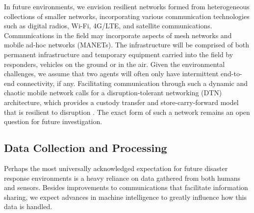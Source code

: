 \documentclass[]             %
{NASA}                       %
\theoremstyle{definition}
\begin{document}
In future environments, we envision resilient networks formed from
heterogeneous collections of smaller networks, incorporating various
communication technologies such as digital radios, Wi-Fi, 4G/LTE, and
satellite communications. Communications in the field may incorporate
aspects of mesh networks and mobile ad-hoc networks (MANETs). The
infrastructure will be comprised of both permanent infrastructure and
temporary equipment carried into the field by responders, vehicles on
the ground or in the air. Given the environmental challenges, we
assume that two agents will often only have intermittent end-to-end
connectivity, if any. Facilitating communication through such a
dynamic and chaotic mobile network calls for a disruption-tolerant
networking (DTN) architecture, which provides a custody transfer and
store-carry-forward model that is resilient to disruption
\cite{2021:intro-dtn}. The exact form of such a network remains an
open question for future investigation.

\subsection{Data Collection and Processing}
\label{ssec:data-collection}
Perhaps the most universally acknowledged expectation for future
disaster response environments is a heavy reliance on data
gathered from both humans and sensors. Besides improvements to
communications that facilitate information sharing, we expect advances
in machine intelligence to greatly influence how this data is
handled.
\end{document}

